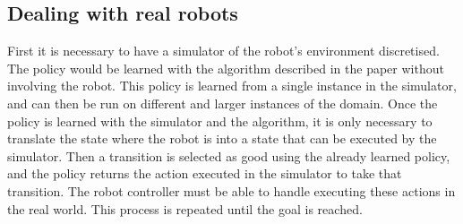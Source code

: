 \documentclass[a4paper]{article}
\begin{document}



\newpage

\subsection{Dealing with real robots}

First it is necessary to have a simulator of the robot's environment discretised. The policy would be learned with the algorithm described in the paper without involving the robot. This policy is learned from a single instance in the simulator, and can then be run on different and larger instances of the domain. Once the policy is learned with the simulator and the algorithm, it is only necessary to translate the state where the robot is into a state that can be executed by the simulator. Then a transition is selected as good using the already learned policy, and the policy returns the action executed in the simulator to take that transition. The robot controller must be able to handle executing these actions in the real world. This process is repeated until the goal is reached.
\end{document}
